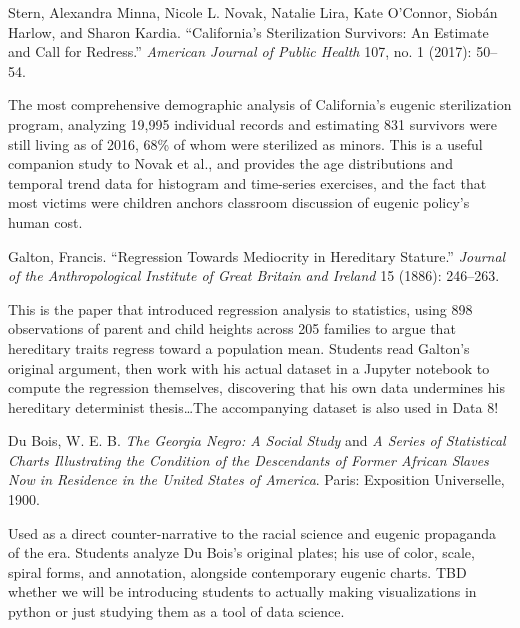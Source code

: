 \documentclass[12pt]{article}
\begin{document}
\begin{bibentry}
Stern, Alexandra Minna, Nicole L. Novak, Natalie Lira, Kate O'Connor, Siob\'{a}n Harlow, and Sharon Kardia. ``California's Sterilization Survivors: An Estimate and Call for Redress.'' \textit{American Journal of Public Health} 107, no. 1 (2017): 50--54.
\end{bibentry}
\begin{annotation}
The most comprehensive demographic analysis of California's eugenic sterilization program, analyzing 19,995 individual records and estimating 831 survivors were still living as of 2016, 68\% of whom were sterilized as minors. This is a useful companion study to Novak et al., and provides the age distributions and temporal trend data for histogram and time-series exercises, and the fact that most victims were children anchors classroom discussion of eugenic policy's human cost.
\end{annotation}

\begin{bibentry}
Galton, Francis. ``Regression Towards Mediocrity in Hereditary Stature.'' \textit{Journal of the Anthropological Institute of Great Britain and Ireland} 15 (1886): 246--263.
\end{bibentry}
\begin{annotation}
This is the paper that introduced regression analysis to statistics, using 898 observations of parent and child heights across 205 families to argue that hereditary traits regress toward a population mean. Students read Galton's original argument, then work with his actual dataset in a Jupyter notebook to compute the regression themselves, discovering that his own data undermines his hereditary determinist thesis\ldots The accompanying dataset is also used in Data 8!
\end{annotation}

\begin{bibentry}
Du Bois, W. E. B. \textit{The Georgia Negro: A Social Study} and \textit{A Series of Statistical Charts Illustrating the Condition of the Descendants of Former African Slaves Now in Residence in the United States of America}. Paris: Exposition Universelle, 1900.
\end{bibentry}
\begin{annotation}
Used as a direct counter-narrative to the racial science and eugenic propaganda of the era. Students analyze Du Bois's original plates; his use of color, scale, spiral forms, and annotation, alongside contemporary eugenic charts. TBD whether we will be introducing students to actually making visualizations in python or just studying them as a tool of data science.
\end{annotation}
\end{document}
